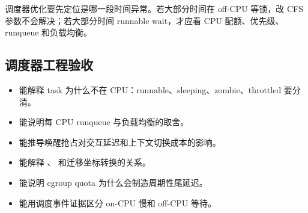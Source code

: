 调度器优化要先定位是哪一段时间异常。若大部分时间在 off-CPU 等锁，改 CFS 参数不会解决；若大部分时间 runnable wait，才应看 CPU 配额、优先级、runqueue 和负载均衡。

\subsection{调度器工程验收}

\begin{itemize}
\tightlist
\item 能解释 task 为什么不在 CPU：runnable、sleeping、zombie、throttled 要分清。
\item 能说明每 CPU runqueue 与负载均衡的取舍。
\item 能推导唤醒抢占对交互延迟和上下文切换成本的影响。
\item 能解释 、 和迁移坐标转换的关系。
\item 能说明 cgroup quota 为什么会制造周期性尾延迟。
\item 能用调度事件证据区分 on-CPU 慢和 off-CPU 等待。
\end{itemize}

